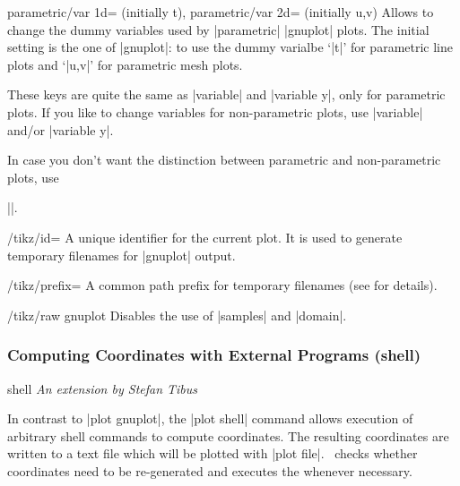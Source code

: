 {\begin{pgfplotskeylist}{%
	parametric/var 1d= (initially t),%
	parametric/var 2d= (initially {u,v})%
	}
	Allows to change the dummy variables used by |parametric| |gnuplot| plots. The initial setting is the one of |gnuplot|: to use the dummy varialbe `|t|' for parametric line plots and `|u,v|' for parametric mesh plots. 

	These keys are quite the same as |variable| and |variable y|, only for parametric plots. If you like to change variables for non-parametric plots, use |variable| and/or |variable y|.

	In case you don't want the distinction between parametric and non-parametric plots, use 
	
	|\pgfplotsset{parametric/var 1d=,parametric/var 2d=}|.

\end{pgfplotskeylist}

\begin{key}{/tikz/id=}
	 A unique identifier for the current plot. It is used to generate temporary filenames for |gnuplot| output.
\end{key}

\begin{key}{/tikz/prefix=}
	 A common path prefix for temporary filenames (see \cite[section~18.6]{tikz} for details).
\end{key}

\begin{key}{/tikz/raw gnuplot}
	 Disables the use of |samples| and |domain|.
\end{key}

\subsubsection{Computing Coordinates with External Programs (shell)}

\begin{addplotoperation}[]{shell}{}
{\small \emph{An extension by Stefan Tibus}}

In contrast to |plot gnuplot|, the |plot shell| command allows execution of arbitrary shell commands to compute coordinates. The resulting coordinates are written to a text file which will be plotted with |plot file|. \PGF\ checks whether coordinates need to be re-generated and executes the  whenever necessary.


\end{addplotoperation}}
